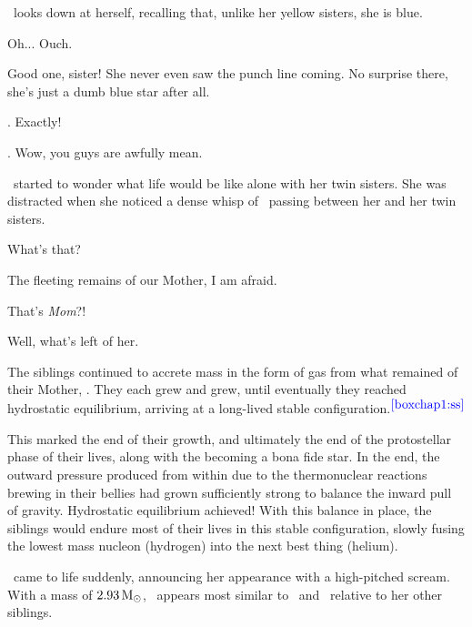 \documentclass[main.tex]{subfiles}
\begin{document}
\par \nar \rmcelaeno~looks down at herself, recalling that, unlike her yellow sisters, she is blue.

\par \Celaeno Oh...  Ouch.

\par \Alcyone Good one, sister!  She never even saw the punch line coming.  No surprise there, she's just a dumb blue star after all.

\par \Taygete. Exactly!

\par \Celaeno. Wow, you guys are awfully mean.

\par \nar \rmcelaeno~started to wonder what life would be like alone with her twin sisters.  She was distracted when she noticed a dense whisp of \rmpleione~passing between her and her twin sisters.  

\par \Celaeno What's that?

\par \Maia The fleeting remains of our Mother, I am afraid.

\par \Electra That's \textit{Mom}?!

\par \Maia Well, what's left of her.

\par \nar The siblings continued to accrete mass in the form of gas from what remained of their Mother, \rmpleione.  They each grew and grew, until eventually they reached hydrostatic equilibrium, arriving at a long-lived stable configuration.$^{\textcolor{blue}{\ref{boxchap1:ss}}}$  

\par \nar This marked the end of their growth, and ultimately the end of the protostellar phase of their lives, along with the becoming a bona fide star.  In the end, the outward pressure produced from within due to the thermonuclear reactions brewing in their bellies had grown sufficiently strong to balance the inward pull of gravity.  Hydrostatic equilibrium achieved!  With this balance in place, the siblings would endure most of their lives in this stable configuration, slowly fusing the lowest mass nucleon (hydrogen) into the next best thing (helium).

\par \nar \rmsterope~came to life suddenly, announcing her appearance with a high-pitched scream.  With a mass of $2.93\,\mathrm{M}_\odot$, \rmsterope~appears most similar to \rmtaygete~and \rmalcyone~relative to her other siblings.
\end{document}
